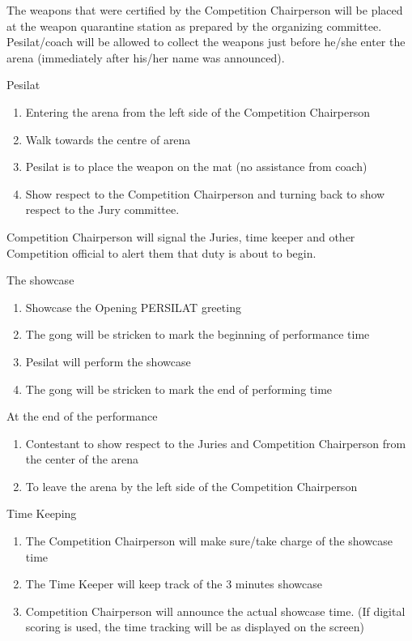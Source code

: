 \begin{legal}
\begin{legal}
    \item The weapons that were certified by the Competition Chairperson will be placed at the weapon quarantine station as prepared by the organizing committee. Pesilat/coach will be allowed to collect the weapons just before he/she enter the arena (immediately after his/her name was announced).

    \item Pesilat
        \begin{enumerate}[label=\alph*.]
        \item Entering the arena from the left side of the Competition Chairperson
        \item Walk towards the centre of arena
        \item Pesilat is to place the weapon on the mat (no assistance from coach)
        \item Show respect to the Competition Chairperson and turning back to show respect to the Jury committee.
        \end{enumerate}

    \item Competition Chairperson will signal the Juries, time keeper and other Competition official to alert them that duty is about to begin.

    \item The showcase
        \begin{enumerate}[label=\alph*.]
        \item Showcase the Opening PERSILAT greeting
        \item The gong will be stricken to mark the beginning of performance time
        \item Pesilat will perform the showcase
        \item The gong will be stricken to mark the end of performing time
        \end{enumerate}

    \item At the end of the performance
        \begin{enumerate}[label=\alph*.]
        \item Contestant to show respect to the Juries and Competition Chairperson from the center of the arena
        \item To leave the arena by the left side of the Competition Chairperson
        \end{enumerate}

    \item Time Keeping
        \begin{enumerate}[label=\alph*.]
        \item The Competition Chairperson will make sure/take charge of the showcase time
        \item The Time Keeper will keep track of the 3 minutes showcase
        \item Competition Chairperson will announce the actual showcase time. (If digital scoring is used, 
              the time tracking will be as displayed on the screen)
        \end{enumerate}


\end{legal}
\end{legal}
